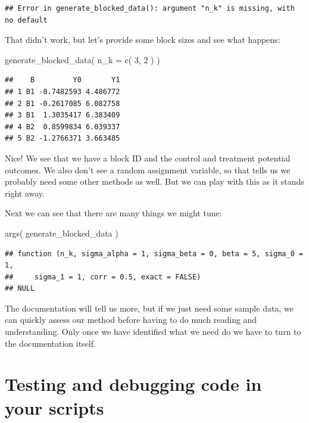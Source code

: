 \documentclass[
]{book}
\newenvironment{Shaded}{\begin{snugshade}}{\end{snugshade}}
\newcommand{\AttributeTok}[1]{\textcolor[rgb]{0.77,0.63,0.00}{#1}}
\newcommand{\DecValTok}[1]{\textcolor[rgb]{0.00,0.00,0.81}{#1}}
\newcommand{\FunctionTok}[1]{\textcolor[rgb]{0.00,0.00,0.00}{#1}}
\newcommand{\NormalTok}[1]{#1}
\begin{document}
\begin{verbatim}
## Error in generate_blocked_data(): argument "n_k" is missing, with no default
\end{verbatim}

That didn't work, but let's provide some block sizes and see what happens:

\begin{Shaded}
\begin{Highlighting}[]
\FunctionTok{generate\_blocked\_data}\NormalTok{( }\AttributeTok{n\_k =} \FunctionTok{c}\NormalTok{( }\DecValTok{3}\NormalTok{, }\DecValTok{2}\NormalTok{ ) )}
\end{Highlighting}
\end{Shaded}

\begin{verbatim}
##    B         Y0       Y1
## 1 B1 -0.7482593 4.486772
## 2 B1 -0.2617085 6.082758
## 3 B1  1.3035417 6.383409
## 4 B2  0.8599834 6.039337
## 5 B2 -1.2766371 3.663485
\end{verbatim}

Nice! We see that we have a block ID and the control and treatment potential outcomes. We also don't see a random assignment variable, so that tells us we probably need some other methods as well.
But we can play with this as it stands right away.

Next we can see that there are many things we might tune:

\begin{Shaded}
\begin{Highlighting}[]
\FunctionTok{args}\NormalTok{( generate\_blocked\_data )}
\end{Highlighting}
\end{Shaded}

\begin{verbatim}
## function (n_k, sigma_alpha = 1, sigma_beta = 0, beta = 5, sigma_0 = 1, 
##     sigma_1 = 1, corr = 0.5, exact = FALSE) 
## NULL
\end{verbatim}

The documentation will tell us more, but if we just need some sample data, we can quickly assess our method before having to do much reading and understanding.
Only once we have identified what we need do we have to turn to the documentation itself.

\hypertarget{testing-and-debugging-code-in-your-scripts}{%
\section{Testing and debugging code in your scripts}\label{testing-and-debugging-code-in-your-scripts}}
\end{document}
